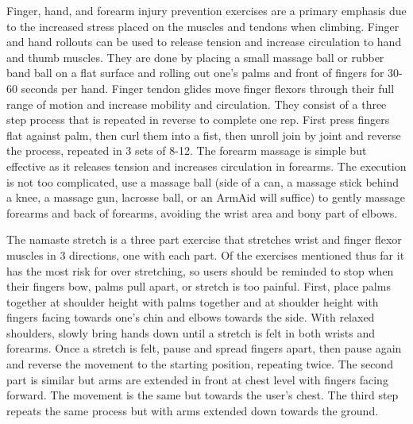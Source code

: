 \documentclass[10pt,twocolumn]{article}
\begin{document}
    Finger, hand, and forearm injury prevention exercises are a primary emphasis due to the increased stress placed on the muscles and tendons when climbing. Finger and hand rollouts can be used to release tension and increase circulation to hand and thumb muscles. They are done by placing a small massage ball or rubber band ball on a flat surface and rolling out one’s palms and front of fingers for 30-60 seconds per hand. Finger tendon glides move finger flexors through their full range of motion and increase mobility and circulation. They consist of a three step process that is repeated in reverse to complete one rep. First press fingers flat against palm, then curl them into a fist, then unroll join by joint and reverse the process, repeated in 3 sets of 8-12. The forearm massage is simple but effective as it releases tension and increases circulation in forearms. The execution is not too complicated, use a massage ball (side of a can, a massage stick behind a knee, a massage gun, lacrosse ball, or an ArmAid will suffice) to gently massage forearms and back of forearms, avoiding the wrist area and bony part of elbows. \cite{carpenter_prevent_2020} 
    
    The namaste stretch is a three part exercise that stretches wrist and finger flexor muscles in 3 directions, one with each part. Of the exercises mentioned thus far it has the most risk for over stretching, so users should be reminded to stop when their fingers bow, palms pull apart, or stretch is too painful. First, place palms together at shoulder height with palms together and at shoulder height with fingers facing towards one’s chin and elbows towards the side. With relaxed shoulders, slowly bring hands down until a stretch is felt in both wrists and forearms. Once a stretch is felt, pause and spread fingers apart, then pause again and reverse the movement to the starting position, repeating twice. The second part is similar but arms are extended in front at chest level with fingers facing forward. The movement is the same but towards the user’s chest. The third step repeats the same process but with arms extended down towards the ground. \cite{carpenter_prevent_2020} 
    
\end{document}
